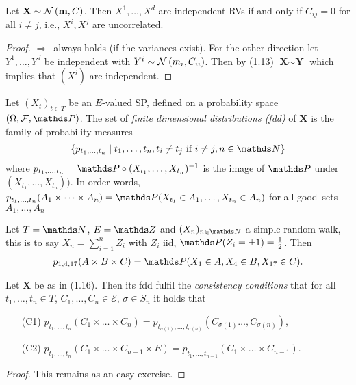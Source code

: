 \begin{prop}
Let $\textbf{X}\sim \mathcal{N}\left(\textbf{m},C\right)$.
Then $X^1,\dots,X^d$ are independent RVs if and only if $C_{ij}=0$ for all $i\not = j$, i.e., $X^i,X^j$ are uncorrelated.
\begin{proof}
\glqq $\Rightarrow$\grqq\, always holds (if the variances exist).
For the other direction let $Y^1,\dots,Y^d$ be independent with $Y^i\sim \mathcal{N}\left(m_i,C_{ii}\right)$.
Then by (1.13) $\textbf{X} \sim \textbf{Y}$ which implies that $(X^i)$ are independent.
\end{proof}
\end{prop}

\begin{defi}
Let $(X_t)_{t \in T}$ be an $E$-valued SP, defined on a probability space $(\Omega,\mathcal{F},\Prob)$. The set of \emph{finite dimensional distributions (fdd)} of $\textbf{X}$ is the family of probability measures
\begin{align*}
\{p_{t_1,\dots,t_n}\mid t_1,\dots,t_n, t_i\not =t_j \text{ if } i \not = j,n\in \N\}
\end{align*}
where $p_{t_1,\dots,t_n}=\Prob \circ (X_{t_1},\dots,X_{t_n})^{-1}$ is the image of $\Prob$ under $(X_{t_1},\dots,X_{t_n}))$.
In order words, $p_{t_1,\dots,t_n}(A_1\times \dots \times A_n)=\Prob(X_{t_1}\in A_1,\dots,X_{t_n}\in A_n)$ for all \glqq good\grqq\, sets $A_1,\dots,A_n$
\end{defi}

\begin{bsp}
Let $T=\N$, $E=\Z$ and $(X_n)_{n\in \N}$ a simple random walk, this is to say
$X_n=\sum_{i=1}^n Z_i$ with $Z_i$ iid, $\Prob(Z_i=\pm 1)=\frac{1}{2}$.
Then
\begin{align*}
p_{1,4,17}(A\times B\times C)=\Prob(X_1\in A,X_4\in B,X_{17}\in C).
\end{align*}
\end{bsp}

\begin{prop}
Let $\textbf{X}$ be as in (1.16). Then its fdd fulfil the \emph{consistency conditions} that for all $t_1,\dots,t_n \in T$, $C_1,\dots,C_n \in \mathcal{E}$, $\sigma\in S_n$ it holds that
\begin{enumerate}
\item[(C1)] $p_{t_1,\dots ,t_n}(C_1\times \dots \times C_n)=p_{t_{\sigma(1)},\dots ,t_{\sigma(n)}}(C_{\sigma(1)}\dots ,C_{\sigma(n)})$,
\item[(C2)] $p_{t_1,\dots , t_n}(C_1\times \dots \times C_{n-1}\times E)=p_{t_1,\dots ,t_{n-1}}(C_1\times \dots \times C_{n-1})$.
\end{enumerate}
\begin{proof}
This remains as an easy exercise.
\end{proof}
\end{prop}

